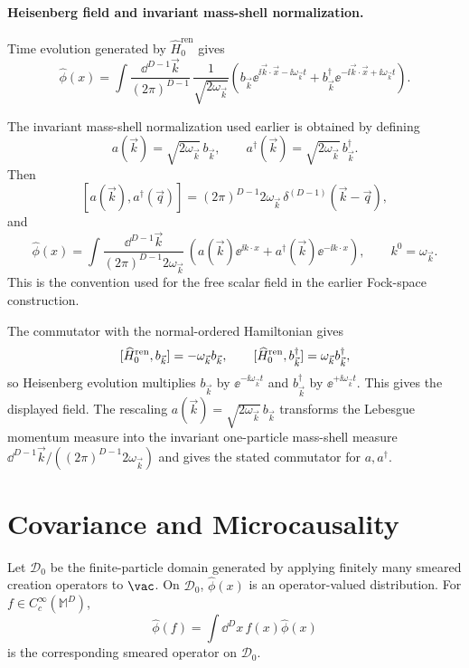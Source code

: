 \paragraph{Heisenberg field and invariant mass-shell normalization.}
Time evolution generated by \(\widehat H_0^{\mathrm{ren}}\) gives
\[
  \widehat\phi(x)
  =
  \int\frac{\dd^{D-1}\vec k}{(2\pi)^{D-1}}\,
  \frac{1}{\sqrt{2\omega_{\vec k}}}
  \left(
    b_{\vec k}\ee^{\ii\vec k\cdot\vec x-\ii\omega_{\vec k}t}
    +
    b^\dagger_{\vec k}\ee^{-\ii\vec k\cdot\vec x+\ii\omega_{\vec k}t}
  \right).
\]

The invariant mass-shell normalization used earlier is obtained by defining
\[
  a(\vec k)=\sqrt{2\omega_{\vec k}}\,b_{\vec k},
  \qquad
  a^\dagger(\vec k)=\sqrt{2\omega_{\vec k}}\,b^\dagger_{\vec k}.
\]
Then
\[
  [a(\vec k),a^\dagger(\vec q)]
  =
  (2\pi)^{D-1}2\omega_{\vec k}\,
  \delta^{(D-1)}(\vec k-\vec q),
\]
and
\[
  \widehat\phi(x)
  =
  \int
  \frac{\dd^{D-1}\vec k}{(2\pi)^{D-1}2\omega_{\vec k}}\,
  \left(
    a(\vec k)\ee^{\ii k\cdot x}
    +
    a^\dagger(\vec k)\ee^{-\ii k\cdot x}
  \right),
  \qquad
  k^0=\omega_{\vec k}.
\]
This is the convention used for the free scalar field in the earlier
Fock-space construction.

The commutator with the normal-ordered Hamiltonian gives
\[
  [\widehat H_0^{\rm ren},b_{\vec k}]=-\omega_{\vec k}b_{\vec k},
  \qquad
  [\widehat H_0^{\rm ren},b^\dagger_{\vec k}]
  =
  \omega_{\vec k}b^\dagger_{\vec k},
\]
so Heisenberg evolution multiplies \(b_{\vec k}\) by
\(\ee^{-\ii\omega_{\vec k}t}\) and \(b^\dagger_{\vec k}\) by
\(\ee^{+\ii\omega_{\vec k}t}\).  This gives the displayed field.  The
rescaling \(a(\vec k)=\sqrt{2\omega_{\vec k}}\,b_{\vec k}\) transforms the
Lebesgue momentum measure into the invariant one-particle mass-shell measure
\(\dd^{D-1}\vec k/((2\pi)^{D-1}2\omega_{\vec k})\) and gives the stated
commutator for \(a,a^\dagger\).

\section{Covariance and Microcausality}

\begin{definition}
\label{def:free-scalar-field-finite-particle-domain}
Let \(\mathcal D_0\) be the finite-particle domain generated by applying
finitely many smeared creation operators to \(\vac\). On \(\mathcal D_0\),
\(\widehat\phi(x)\) is an operator-valued distribution. For
\(f\in C_c^\infty(\mathbb M^D)\),
\[
  \widehat\phi(f)=\int\dd^D x\,f(x)\widehat\phi(x)
\]
is the corresponding smeared operator on \(\mathcal D_0\).
\end{definition}

